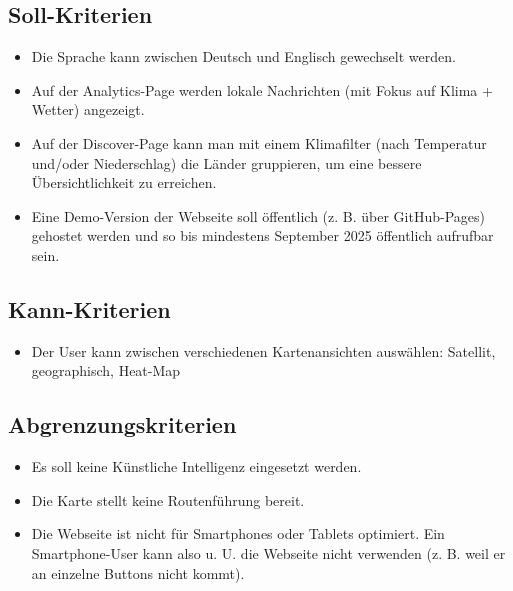 \documentclass[12pt]{article}
\begin{document}
\subsection*{Soll-Kriterien}
\begin{itemize}
    \item Die Sprache kann zwischen Deutsch und Englisch gewechselt werden.
    \item Auf der Analytics-Page werden lokale Nachrichten (mit Fokus auf Klima + Wetter) angezeigt.
    \item Auf der Discover-Page kann man mit einem Klimafilter (nach Temperatur und/oder Niederschlag) die Länder gruppieren, um eine bessere Übersichtlichkeit zu erreichen.
    \item Eine Demo-Version der Webseite soll öffentlich (z. B. über GitHub-Pages) gehostet werden und so bis mindestens September 2025 öffentlich aufrufbar sein.
\end{itemize}

\subsection*{Kann-Kriterien}
\begin{itemize}
    \item Der User kann zwischen verschiedenen Kartenansichten auswählen: Satellit, geographisch, Heat-Map
\end{itemize}

\subsection*{Abgrenzungskriterien}
\begin{itemize}
    \item Es soll keine Künstliche Intelligenz eingesetzt werden.
    \item Die Karte stellt keine Routenführung bereit.
    \item Die Webseite ist nicht für Smartphones oder Tablets optimiert. Ein Smartphone-User kann also u. U. die Webseite nicht verwenden (z. B. weil er an einzelne Buttons nicht kommt).
\end{itemize}
\end{document}
